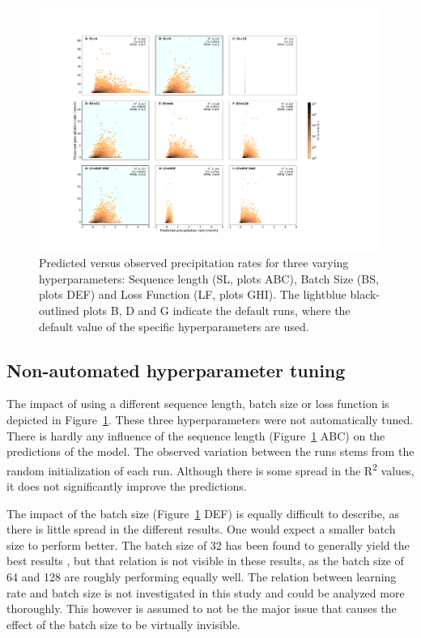 \documentclass[twocolumn, 10pt, a4paper]{memoir}
\begin{document}
	\begin{figure}[t]
		\hspace*{-3cm}
		\includegraphics[width=25cm]{ex_seq_len}
		\vspace*{-1.5cm}
		\caption{Predicted versus observed precipitation rates for three varying hyperparameters: Sequence length (SL, plots ABC), Batch Size (BS, plots DEF) and Loss Function (LF, plots GHI). The lightblue black-outlined plots B, D and G indicate the default runs, where the default value of the specific hyperparameters are used.}
		\label{fig: seqlen}
	\end{figure}

	\subsection*{Non-automated hyperparameter tuning}
	The impact of using a different sequence length, batch size or loss function is depicted in Figure~\ref{fig: seqlen}. These three hyperparameters were not automatically tuned. There is hardly any influence of the sequence length (Figure~\ref{fig: seqlen} ABC) on the predictions of the model. The observed variation between the runs stems from the random initialization of each run. Although there is some spread in the R\textsuperscript{2} values, it does not significantly improve the predictions. 
	
	The impact of the batch size (Figure~\ref{fig: seqlen} DEF) is equally difficult to describe, as there is little spread in the different results. One would expect a smaller batch size to perform better. The batch size of 32 has been found to generally yield the best results \cite{Bengio2012}, but that relation is not visible in these results, as the batch size of 64 and 128 are roughly performing equally well. The relation between learning rate and batch size is not investigated in this study and could be analyzed more thoroughly. This however is assumed to not be the major issue that causes the effect of the batch size to be virtually invisible. 
	
\end{document}
